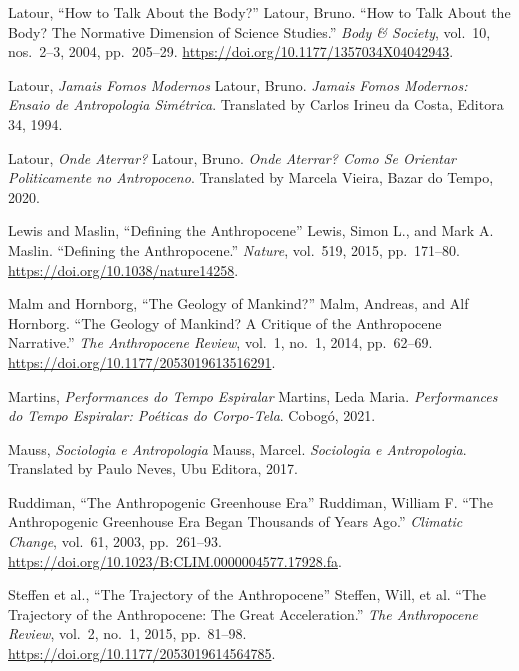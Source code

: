   {Latour, \enquote{How to Talk About the Body?}}
  {Latour, Bruno. \enquote{How to Talk About the Body? The Normative
   Dimension of Science Studies.} \emph{Body \& Society}, vol.~10,
   nos.~2--3, 2004, pp.~205--29.
   \url{https://doi.org/10.1177/1357034X04042943}.}

  {Latour, \emph{Jamais Fomos Modernos}}
  {Latour, Bruno. \emph{Jamais Fomos Modernos: Ensaio de Antropologia
   Simétrica}. Translated by Carlos Irineu da Costa, Editora 34, 1994.}

  {Latour, \emph{Onde Aterrar?}}
  {Latour, Bruno. \emph{Onde Aterrar? Como Se Orientar Politicamente
   no Antropoceno}. Translated by Marcela Vieira, Bazar do Tempo, 2020.}

  {Lewis and Maslin, \enquote{Defining the Anthropocene}}
  {Lewis, Simon L., and Mark A. Maslin. \enquote{Defining the Anthropocene.}
   \emph{Nature}, vol.~519, 2015, pp.~171--80.
   \url{https://doi.org/10.1038/nature14258}.}

  {Malm and Hornborg, \enquote{The Geology of Mankind?}}
  {Malm, Andreas, and Alf Hornborg. \enquote{The Geology of Mankind?
   A Critique of the Anthropocene Narrative.} \emph{The Anthropocene
   Review}, vol.~1, no.~1, 2014, pp.~62--69.
   \url{https://doi.org/10.1177/2053019613516291}.}

  {Martins, \emph{Performances do Tempo Espiralar}}
  {Martins, Leda Maria. \emph{Performances do Tempo Espiralar:
   Poéticas do Corpo-Tela}. Cobogó, 2021.}

  {Mauss, \emph{Sociologia e Antropologia}}
  {Mauss, Marcel. \emph{Sociologia e Antropologia}.
   Translated by Paulo Neves, Ubu Editora, 2017.}

  {Ruddiman, \enquote{The Anthropogenic Greenhouse Era}}
  {Ruddiman, William F. \enquote{The Anthropogenic Greenhouse Era
   Began Thousands of Years Ago.} \emph{Climatic Change}, vol.~61,
   2003, pp.~261--93. \url{https://doi.org/10.1023/B:CLIM.0000004577.17928.fa}.}

  {Steffen et al., \enquote{The Trajectory of the Anthropocene}}
  {Steffen, Will, et al. \enquote{The Trajectory of the Anthropocene:
   The Great Acceleration.} \emph{The Anthropocene Review}, vol.~2,
   no.~1, 2015, pp.~81--98. \url{https://doi.org/10.1177/2053019614564785}.}


